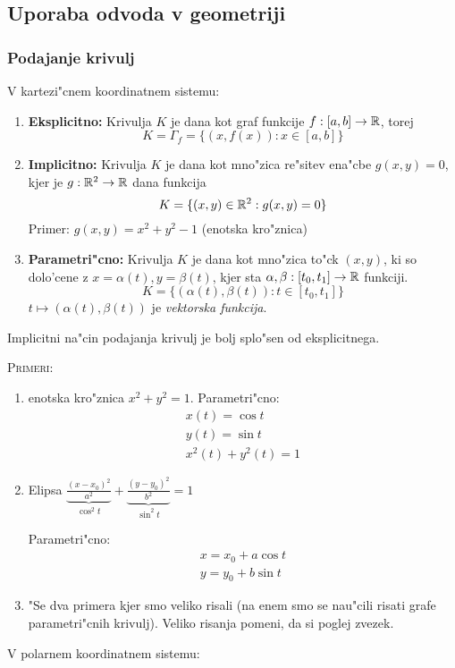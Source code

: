 \subsection{Uporaba odvoda v geometriji}
\subsubsection{Podajanje krivulj}
V kartezi"cnem koordinatnem sistemu:
\begin{enumerate}
	\item \textbf{Eksplicitno:} Krivulja $K$ je dana kot graf funkcije $f: [a, b] \to \mathbb{R}$, torej
	\begin{equation*}
	K = \Gamma_f = \{(x, f(x)): x \in [a, b]\}
	\end{equation*}
	
	\item \textbf{Implicitno:} Krivulja $K$ je dana kot mno"zica re"sitev ena"cbe $g(x, y) = 0$, kjer je $g: \mathbb{R}^2 \to \mathbb{R}$ dana funkcija
	\begin{equation*}
	K = \{(x, y) \in \mathbb{R}^2: g(x, y) = 0\}
	\end{equation*}
	Primer: $g(x, y) = x^2 + y^2 - 1$ (enotska kro"znica)
	
	\item \textbf{Parametri"cno:} Krivulja $K$ je dana kot mno"zica to"ck $(x, y)$, ki so dolo'cene z $x = \alpha(t), y = \beta(t)$, kjer sta $\alpha, \beta: [t_0, t_1] \to \mathbb{R}$ funkciji.
	\begin{equation*}
	K = \{(\alpha(t), \beta(t)): t \in [t_0, t_1]\}
	\end{equation*}
	$t \mapsto (\alpha(t), \beta(t))$ je \emph{vektorska funkcija}.
\end{enumerate}
Implicitni na"cin podajanja krivulj je bolj splo"sen od eksplicitnega.

\textsc{Primeri:}
\begin{enumerate}
	\item enotska kro"znica $x^2 + y^2 = 1$. Parametri"cno:
	\begin{gather*}
		x(t) = \cos t \\
		y(t) = \sin t \\
		x^2(t) + y^2 (t) = 1
	\end{gather*}
	
	\item Elipsa $\underbrace{\frac{(x - x_0)^2}{a^2}}_{\cos^2 t} + \underbrace{\frac{(y - y_0)^2}{b^2}}_{\sin^2 t} = 1$
	
	Parametri"cno:
	\begin{gather*}
	x = x_0 + a \cos t \\
	y = y_0 + b \sin t
	\end{gather*}
	
	\item "Se dva primera kjer smo veliko risali (na enem smo se nau"cili risati grafe parametri"cnih krivulj). Veliko risanja pomeni, da si poglej zvezek.
\end{enumerate}
%
V polarnem koordinatnem sistemu:

